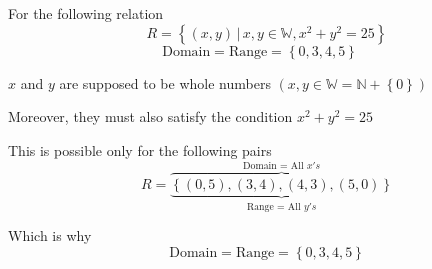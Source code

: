 \documentclass[14pt,fleqn]{extarticle}
\newcommand\W{\mathbb{W}}
\begin{document}
 
\begin{snippet}
    \correct
    
    For the following relation 
    \[ \quad R = \left\lbrace (x,y)\,\vert\, x,y\in\W, x^2 + y^2 = 25 \right\rbrace\]
    \[ \text{Domain} = \text{Range} = \left\lbrace 0,3,4,5\right\rbrace\]
    
    
    \reason
    
    $x$ and $y$ are supposed to be whole numbers $(x,y\in\W = \mathbb{N} + \left\lbrace 0\right\rbrace)$\newline 
    
    Moreover, they must also satisfy the condition $x^2 + y^2 = 25$ \newline 
    
    This is possible only for the following pairs 
    \[ \quad R = \overbrace{\underbrace{\left\lbrace (0,5),(3,4),(4,3),(5,0) \right\rbrace}_{\text{Range = All $y's$}}}^{\text{Domain = All $x's$}}\]
    
    Which is why 
    \[ \quad \text{Domain} = \text{Range} = \left\lbrace 0,3,4,5\right\rbrace\]
    
\end{snippet} 
\end{document}
